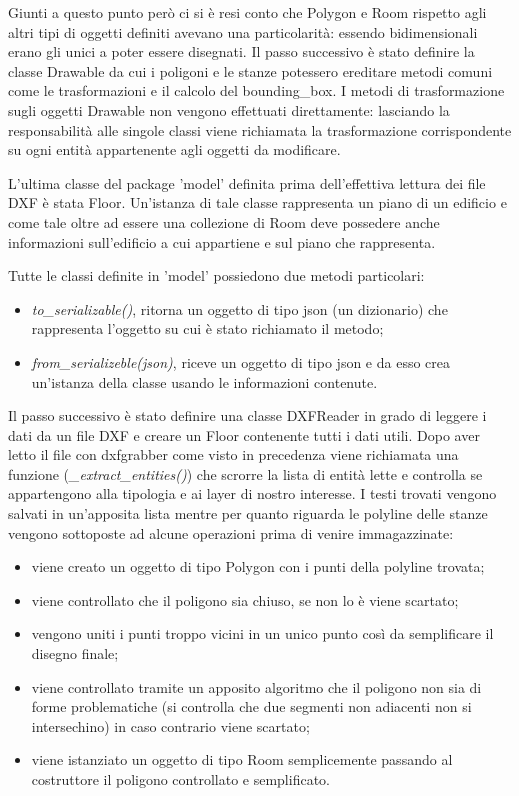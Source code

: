 \documentclass[12pt]{report}
\begin{document}
Giunti a questo punto però ci si è resi conto che Polygon e Room rispetto agli altri tipi di oggetti definiti avevano una particolarità: essendo bidimensionali erano gli unici a poter essere disegnati.
Il passo successivo è stato definire la classe Drawable da cui i poligoni e le stanze potessero ereditare metodi comuni come le trasformazioni e il calcolo del bounding\_box.
I metodi di trasformazione sugli oggetti Drawable non vengono effettuati direttamente: lasciando la responsabilità alle singole classi viene richiamata la trasformazione corrispondente su ogni entità appartenente agli oggetti da modificare.

L'ultima classe del package 'model' definita prima dell'effettiva lettura dei file DXF è stata Floor. Un'istanza di tale classe rappresenta un piano di un edificio e come tale oltre ad essere una collezione di Room deve possedere anche informazioni sull'edificio a cui appartiene e sul piano che rappresenta.

Tutte le classi definite in 'model' possiedono due metodi particolari:
\begin{itemize}
\item \textit{to\_serializable()}, ritorna un oggetto di tipo json (un dizionario) che rappresenta l'oggetto su cui è stato richiamato il metodo;
\item \textit{from\_serializeble(json)}, riceve un oggetto di tipo json e da esso crea un'istanza della classe usando le informazioni contenute.
\end{itemize}

\vspace{5mm} %

Il passo successivo è stato definire una classe DXFReader in grado di leggere i dati da un file DXF e creare un Floor contenente tutti i dati utili.
Dopo aver letto il file con dxfgrabber come visto in precedenza viene richiamata una funzione (\textit{\_extract\_entities()}) che scrorre la lista di entità lette e controlla se appartengono alla tipologia e ai layer di nostro interesse.
I testi trovati vengono salvati in un'apposita lista mentre per quanto riguarda le polyline delle stanze vengono sottoposte ad alcune operazioni prima di venire immagazzinate:
\begin{itemize}
\item viene creato un oggetto di tipo Polygon con i punti della polyline trovata;
\item viene controllato che il poligono sia chiuso, se non lo è viene scartato;
\item vengono uniti i punti troppo vicini in un unico punto così da semplificare il disegno finale;
\item viene controllato tramite un apposito algoritmo che il poligono non sia di forme problematiche (si controlla che due segmenti non adiacenti non si intersechino) in caso contrario viene scartato;
\item viene istanziato un oggetto di tipo Room semplicemente passando al costruttore il poligono controllato e semplificato.
\end{itemize}
\end{document}
